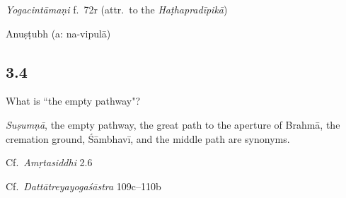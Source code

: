 \begin{ekdosis}
\begin{sources}[hp03_003]
\end{sources}

\begin{testimonia}[hp03_003]
\emph{Yogacintāmaṇi} f.~72r (attr.~to the \emph{Haṭhapradīpikā})

\begin{versinnote}
\end{versinnote}

\end{testimonia}


\begin{metre}[hp03_003]
Anuṣṭubh (a: na-vipulā)
\end{metre}

\subsection*{3.4}
What is ``the empty pathway"?

\begin{translation}[hp03_004]
\emph{Suṣumṇā}, the empty pathway, the great path to the aperture of Brahmā, the cremation ground, Śāmbhavī, and the middle path are synonyms.
\end{translation}

\begin{sources}[hp03_004]
Cf.~\emph{Amṛtasiddhi} 2.6
\begin{versinnote}
\end{versinnote}

Cf.~\emph{Dattātreyayogaśāstra} 109c–110b
\begin{versinnote}
\end{versinnote}
\end{sources}


\end{ekdosis}

